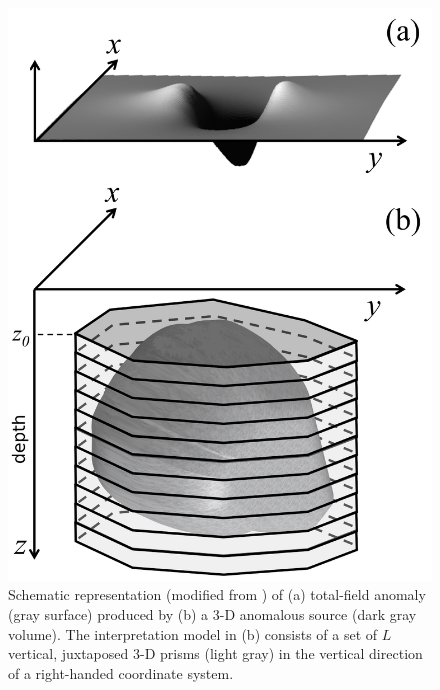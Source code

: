 
\begin{figure}
    \centering
    \includegraphics[scale=1]{figures/observed_data.png}
    \caption{Schematic representation (modified from \cite{oliveirajr-barbosa2013}) of (a) total-field anomaly (gray surface) produced by (b) a 3-D anomalous source (dark gray volume). The interpretation model in (b) consists of a set of $L$ vertical, juxtaposed 3-D prisms (light gray) in the vertical direction of a right-handed coordinate system.}
    \label{fig:obs}
\end{figure}

